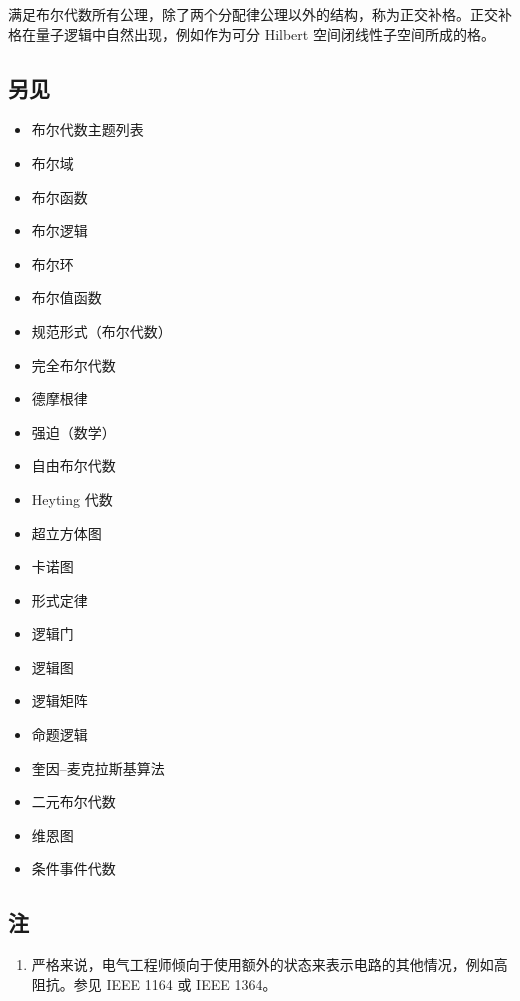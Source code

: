 满足布尔代数所有公理，除了两个分配律公理以外的结构，称为正交补格。正交补格在量子逻辑中自然出现，例如作为可分 Hilbert 空间闭线性子空间所成的格。
\subsection{另见}
\begin{itemize}
\item 布尔代数主题列表
\item 布尔域
\item 布尔函数
\item 布尔逻辑
\item 布尔环
\item 布尔值函数
\item 规范形式（布尔代数）
\item 完全布尔代数
\item 德摩根律
\item 强迫（数学）
\item 自由布尔代数
\item Heyting 代数
\item 超立方体图
\item 卡诺图
\item 形式定律
\item 逻辑门
\item 逻辑图
\item 逻辑矩阵
\item 命题逻辑
\item 奎因–麦克拉斯基算法
\item 二元布尔代数
\item 维恩图
\item 条件事件代数
\end{itemize}
\subsection{注}
\begin{enumerate}
\item 严格来说，电气工程师倾向于使用额外的状态来表示电路的其他情况，例如高阻抗。参见 IEEE 1164 或 IEEE 1364。
\end{enumerate}
